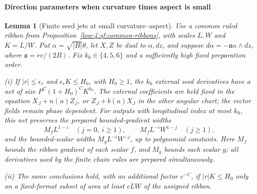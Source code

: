 \documentclass[11pt]{amsart}
\newtheorem{lemma}[theorem]{Lemma}
\theoremstyle{definition}
\theoremstyle{remark}
\numberwithin{equation}{section}
\begin{document}
\paragraph{Direction parameters when curvature times aspect is small}
\begin{lemma}[Finite seed jets at small curvature--aspect]\label{low:surface:seed-rounding}
Use a common ruled ribbon from Proposition~\ref{low:4:sf:common-ribbons}, with scales $L,W$ and $K=L/W$. Put $\alpha=\sqrt{|B|}\theta$, let $X,Z$ be dual to $\alpha,dz$, and suppose $d\alpha=-\mathfrak a\alpha\wedge dz$, where $\mathfrak a=rv/(2B)$. Fix $k_0\in\{4,5,6\}$ and a sufficiently high fixed preparation order.

\noindent\textup{(i)} If $|r|\le\epsilon_r$ and $\epsilon_rK\le H_0$, with $H_0\ge1$, the $k_0$ external seed derivatives have a net of size $P^C(1+H_0)^CK^{k_0}$. The external coefficients are held fixed in the equation $X_J+n(u)Z_J$, or $Z_J+b(u)X_J$ in the other angular chart; the vector fields remain phase dependent. For outputs with longitudinal index at most $k_0$, this net preserves the prepared bounded-gradient widths
\[
M_fL^{1-i}\quad(j=0,\ i\ge1),\qquad M_fL^{-i}W^{1-j}\quad(j\ge1),
\]
and the bounded-scalar widths $M_gL^{-i}W^{-j}$, up to polynomial constants. Here $M_f$ bounds the ribbon gradient of each scalar $f$, and $M_g$ bounds each scalar $g$; all derivatives used by the finite chain rules are prepared simultaneously.

\noindent\textup{(ii)} The same conclusions hold, with an additional factor $c^{-C}$, if $|r|K\le H_0$ only on a fixed-format subset of area at least $cLW$ of the assigned ribbon.
\end{lemma}
\end{document}
